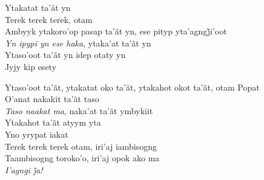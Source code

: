 \bigskip

\begin{linenumbers}\begingroup\raggedright

\noindent   Ytakatat ta'ãt yn\\
  Terek terek terek, otam\\
  Ambyyk ytakoro’op pasap ta’ãt yn, ese pityp yta’agngj̃i’oot\\
  \emph{Yn ipypĩ yn ese haka}, ytaka’at ta’ãt yn\\
  Ytaso'oot ta'ãt yn idep otaty yn\\
  Jyjy kip esety

\end{linenumbers}\endgroup

\bigskip

\begin{linenumbers}\begingroup\raggedright

\noindent   Ytaso'oot ta'ãt, ytakatat oko ta'ãt, ytakahot okot ta'ãt, otam Popat\\
  O'anat nakakit ta'ãt taso\\
  \emph{Taso naakat ma}, naka'at ta'ãt ymbykiit\\
  Ytakahot ta'ãt atyym yta\\
  Yno yrypat iakat\\
  Terek terek terek otam, iri'aj iambisogng\\
  Taambisogng toroko'o, iri'aj opok ako ma\\
  \emph{I’agngi j̃a!}

\end{linenumbers}\endgroup

